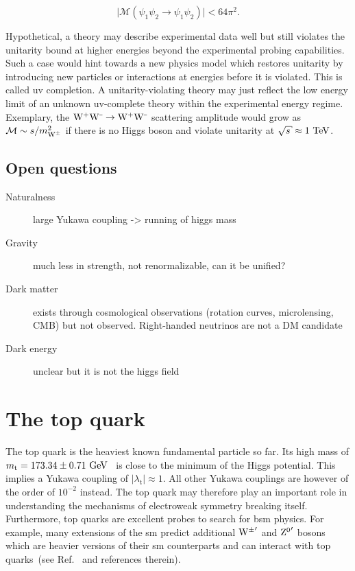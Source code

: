 \begin{equation}
\Big|\mathcal{M}(\psi_{1}\psi_{2}\to\psi_{1}\psi_{2})\Big|<64\pi^2.
\end{equation}

Hypothetical, a theory may describe experimental data well but still violates the unitarity bound at higher energies beyond the experimental probing capabilities. Such a case would hint towards a new physics model which restores unitarity by introducing new particles or interactions at energies before it is violated. This is called \gls{uv} completion. A unitarity-violating theory may just reflect the low energy limit of an unknown \gls{uv}-complete theory within the experimental energy regime. Exemplary,  the $\mathrm{W}^{\rmplus}\mathrm{W}^{\rmminus}\to\mathrm{W}^{\rmplus}\mathrm{W}^{\rmminus}$ scattering amplitude would grow as $\mathcal{M}\sim s/m_{\mathrm{W}^{\pm}}^2$ if there is no Higgs boson and violate unitarity at $\sqrt{s}\approx1~\TeV$.


\subsection{Open questions}

\begin{description}
\item[Naturalness] large Yukawa coupling -> running of higgs mass
\item[Gravity] much less in strength, not renormalizable, can it be unified?
\item[Dark matter] exists through cosmological observations (rotation curves, microlensing, CMB) but not observed. Right-handed neutrinos are not a DM candidate
\item[Dark energy] unclear but it is not the higgs field
\end{description}

\section{The top quark}

The top quark is the heaviest known fundamental particle so far. Its high mass of $m_\mathrm{t}=173.34\pm0.71~\mathrm{GeV}$~\cite{ATLAS:2014wva} is close to the minimum of the Higgs potential. This implies a Yukawa coupling of $|\lambda_\mathrm{t}|\approx 1$. All other Yukawa couplings are however of the order of $10^{-2}$ instead. The top quark may therefore play an important role in understanding the mechanisms of electroweak symmetry breaking itself. Furthermore, top quarks are excellent probes to search for \gls{bsm} physics. For example, many extensions of the \gls{sm} predict additional $\wboson^{\prime}$ and $\zboson^{\prime}$ bosons which are heavier versions of their \gls{sm} counterparts and can interact with top quarks~(see Ref.~\cite{Boos:2006xe} and references therein). 

